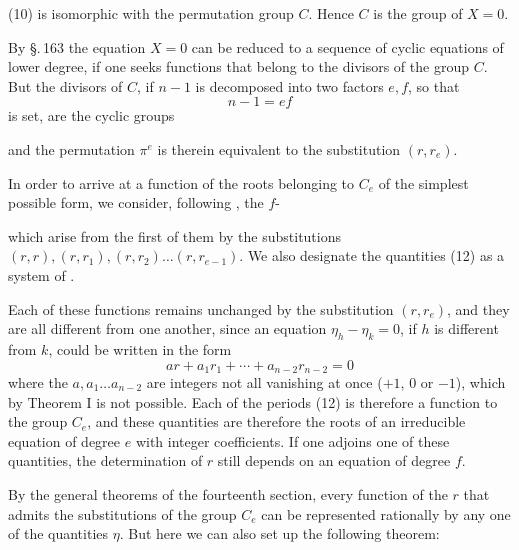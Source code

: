 
(10) is isomorphic with the permutation group $C$. Hence $C$ is the  group of $X = 0$.

By \S.\,163 the equation $X = 0$ can be reduced to a sequence of cyclic equations of lower degree, if one seeks functions that belong to the divisors of the group $C$. But the divisors of $C$, if $n - 1$ is decomposed into two factors $e, f$, so that
\[
n - 1 = ef
\]
is set, are the cyclic groups


and the permutation $\pi^e$ is therein equivalent to the substitution $(r, r_e)$.

In order to arrive at a function of the roots belonging to $C_e$ of the simplest possible form, we consider, following , the $f$-


which arise from the first of them by the substitutions $(r, r), (r, r_1), (r, r_2) \ldots (r, r_{e-1})$. We also designate the quantities (12) as a system of .

Each of these functions remains unchanged by the substitution $(r, r_e)$, and they are all different from one another, since an equation $\eta_h - \eta_k = 0$, if $h$ is different from $k$, could be written in the form
\[
a r + a_1 r_1 + \cdots + a_{n-2} r_{n-2} = 0
\]
where the $a, a_1 \ldots a_{n-2}$ are integers not all vanishing at once ($+ 1$, $0$ or $- 1$), which by Theorem I is not possible. Each of the periods (12) is therefore a function  to the group $C_e$, and these quantities are therefore the roots of an irreducible equation of degree $e$ with integer coefficients. If one adjoins one of these quantities, the determination of $r$ still depends on an equation of degree $f$.

By the general theorems of the fourteenth section, every function of the $r$ that admits the substitutions of the group $C_e$ can be represented rationally by any one of the quantities $\eta$. But here we can also set up the following theorem:
